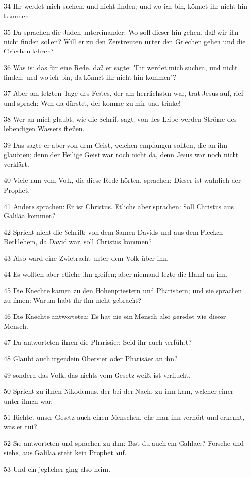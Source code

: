 \par 34 Ihr werdet mich suchen, und nicht finden; und wo ich bin, könnet ihr nicht hin kommen.
\par 35 Da sprachen die Juden untereinander: Wo soll dieser hin gehen, daß wir ihn nicht finden sollen? Will er zu den Zerstreuten unter den Griechen gehen und die Griechen lehren?
\par 36 Was ist das für eine Rede, daß er sagte: "Ihr werdet mich suchen, und nicht finden; und wo ich bin, da könnet ihr nicht hin kommen"?
\par 37 Aber am letzten Tage des Festes, der am herrlichsten war, trat Jesus auf, rief und sprach: Wen da dürstet, der komme zu mir und trinke!
\par 38 Wer an mich glaubt, wie die Schrift sagt, von des Leibe werden Ströme des lebendigen Wassers fließen.
\par 39 Das sagte er aber von dem Geist, welchen empfangen sollten, die an ihn glaubten; denn der Heilige Geist war noch nicht da, denn Jesus war noch nicht verklärt.
\par 40 Viele nun vom Volk, die diese Rede hörten, sprachen: Dieser ist wahrlich der Prophet.
\par 41 Andere sprachen: Er ist Christus. Etliche aber sprachen: Soll Christus aus Galiläa kommen?
\par 42 Spricht nicht die Schrift: von dem Samen Davids und aus dem Flecken Bethlehem, da David war, soll Christus kommen?
\par 43 Also ward eine Zwietracht unter dem Volk über ihn.
\par 44 Es wollten aber etliche ihn greifen; aber niemand legte die Hand an ihn.
\par 45 Die Knechte kamen zu den Hohenpriestern und Pharisäern; und sie sprachen zu ihnen: Warum habt ihr ihn nicht gebracht?
\par 46 Die Knechte antworteten: Es hat nie ein Mensch also geredet wie dieser Mensch.
\par 47 Da antworteten ihnen die Pharisäer: Seid ihr auch verführt?
\par 48 Glaubt auch irgendein Oberster oder Pharisäer an ihn?
\par 49 sondern das Volk, das nichts vom Gesetz weiß, ist verflucht.
\par 50 Spricht zu ihnen Nikodemus, der bei der Nacht zu ihm kam, welcher einer unter ihnen war:
\par 51 Richtet unser Gesetz auch einen Menschen, ehe man ihn verhört und erkennt, was er tut?
\par 52 Sie antworteten und sprachen zu ihm: Bist du auch ein Galiläer? Forsche und siehe, aus Galiläa steht kein Prophet auf.
\par 53 Und ein jeglicher ging also heim.

